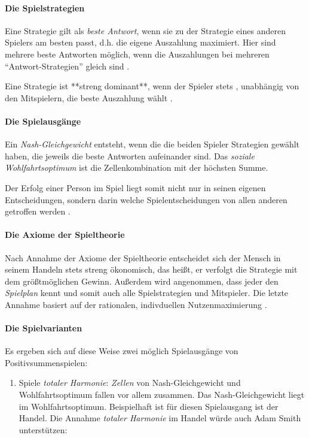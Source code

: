 {\paragraph*{Die Spielstrategien}

Eine Strategie gilt als \emph{beste Antwort}, wenn sie zu der Strategie eines anderen Spielers am besten passt, d.h. die eigene Auszahlung maximiert.
Hier sind mehrere beste Antworten möglich, wenn die Auszahlungen bei mehreren ``Antwort-Strategien'' gleich sind \citep[vgl.][153]{Kleinberg-2009-oz}.

Eine Strategie ist **streng dominant**, wenn der Spieler  stets , unabhängig von den Mitspielern, die beste Auszahlung wählt \citep[vgl.][164]{Kleinberg-2009-oz}.


\paragraph*{Die Spielausgänge}

Ein \emph{Nash-Gleichgewicht } entsteht, wenn die die beiden Spieler Strategien gewählt haben, die jeweils die beste Antworten aufeinander sind.
Das \emph{soziale Wohlfahrtsoptimum} ist die Zellenkombination mit der höchsten Summe.

Der Erfolg einer Person im Spiel liegt somit nicht nur in seinen eigenen Entscheidungen, sondern darin welche Spielentscheidungen von allen anderen getroffen werden \citep[vgl.][156]{Kleinberg-2009-oz}.


\paragraph*{Die Axiome der Spieltheorie}

Nach Annahme der Axiome der Spieltheorie entscheidet sich der Mensch in seinem Handeln stets streng ökonomisch, das heißt, er verfolgt die Strategie mit dem größtmöglichen Gewinn.
Außerdem wird angenommen, dass jeder den \emph{Spielplan} kennt und somit auch alle Spielstrategien und Mitspieler.
Die letzte Annahme basiert auf der rationalen, indivduellen Nutzenmaximierung \citep[vgl.][159]{Kleinberg-2009-oz}.


\paragraph*{Die Spielvarianten}

Es ergeben sich auf diese Weise zwei möglich Spielausgänge von Positivsummenspielen:

\begin{enumerate}
		\item Spiele \emph{totaler Harmonie}: \emph{Zellen} von Nash-Gleichgewicht und Wohlfahrtsoptimum fallen vor allem zusammen. Das Nash-Gleichgewicht liegt im Wohlfahrtsoptimum.
		Beispielhaft ist für diesen Spielausgang ist der Handel.
		Die Annahme \emph{totaler Harmonie} im Handel würde auch Adam Smith unterstützen:


\end{enumerate}}

